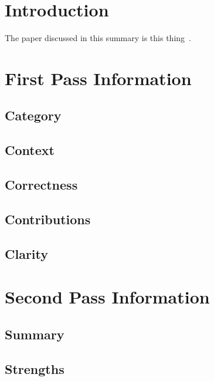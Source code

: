 
\newpage

\section{Introduction}

The paper discussed in this summary is this thing~\cite{mininet}.

\section{First Pass Information}

\subsection{Category}


\subsection{Context}


\subsection{Correctness}


\subsection{Contributions}


\subsection{Clarity}


\section{Second Pass Information}

\subsection{Summary}


\subsection{Strengths}


